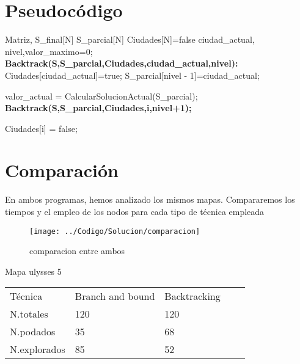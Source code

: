 		

	\section{Pseudocódigo}


		\footnotesize{	
			\begin{algorithmic}				
				\Require Matriz, S\_final[N] S\_parcial[N] Ciudades[N]={false} ciudad\_actual, nivel,valor\_maximo=0;
				\State \textbf{Backtrack(S,S\_parcial,Ciudades,ciudad\_actual,nivel):}
				\State Ciudades[ciudad\_actual]=true;
				\State	   S\_parcial[nivel - 1]=ciudad\_actual;
				
				\State 	valor\_actual = CalcularSolucionActual(S\_parcial);
				\State 	\textbf{Backtrack(S,S\_parcial,Ciudades,i,nivel+1);}
				\EndIf
				\EndIf
				
				\State Ciudades[i] = false;
				\EndIf
				\EndFor
			\end{algorithmic}			
		}

	
	
	\section{Comparación}


		En ambos programas, hemos analizado los mismos mapas. Compararemos los tiempos y el empleo de los nodos para cada tipo de técnica empleada

	
	


		\begin{figure}[H]
			\centering
			\texttt{[image: ../Codigo/Solucion/comparacion]}
			\caption{comparacion entre ambos }
			\label{fig:comparacion}
		\end{figure}
		
		

	
	



		\begin{table}[H]
							Mapa ulysses 5
			\centering
			
			\label{my-label}
			\begin{tabular}{lllll}
				Técnica	& Branch and bound & Backtracking  &   \\
				N.totales& 120&120  &  &  \\
				N.podados&  35& 68 &  &  \\
				N.explorados&85  &52  &  &  \\
				
			\end{tabular}
		\end{table}
		

